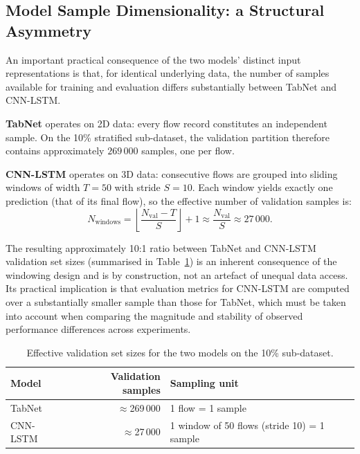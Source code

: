 \documentclass[../main.tex]{subfiles}
\begin{document}
\subsection{Model Sample Dimensionality: a Structural Asymmetry}
\label{sec:sample-dimensionality}

An important practical consequence of the two models' distinct input representations is that, for identical underlying data, the number of samples available for training and evaluation differs substantially between TabNet and CNN-LSTM.

\textbf{TabNet} operates on 2D data: every flow record constitutes an independent sample.  On the 10\% stratified sub-dataset, the validation partition therefore contains approximately $269\,000$ samples, one per flow.

\textbf{CNN-LSTM} operates on 3D data: consecutive flows are grouped into sliding windows of width $T = 50$ with stride $S = 10$.  Each window yields exactly one prediction (that of its final flow), so the effective number of validation samples is:
\[
    N_{\text{windows}} = \left\lfloor \frac{N_{\text{val}} - T}{S} \right\rfloor + 1
    \approx \frac{N_{\text{val}}}{S} \approx 27\,000.
\]

The resulting approximately 10:1 ratio between TabNet and CNN-LSTM validation set sizes (summarised in Table~\ref{tab:sample-sizes}) is an inherent consequence of the windowing design and is by construction, not an artefact of unequal data access.  Its practical implication is that evaluation metrics for CNN-LSTM are computed over a substantially smaller sample than those for TabNet, which must be taken into account when comparing the magnitude and stability of observed performance differences across experiments.

\begin{table}[H]
\centering
\caption{Effective validation set sizes for the two models on the 10\% sub-dataset.}
\label{tab:sample-sizes}
\small
\begin{tabular}{lrl}
\toprule
\textbf{Model}  & \textbf{Validation samples} & \textbf{Sampling unit} \\
\midrule
TabNet          & $\approx$269\,000           & 1 flow = 1 sample \\
CNN-LSTM        & $\approx$27\,000            & 1 window of 50 flows (stride 10) = 1 sample \\
\bottomrule
\end{tabular}
\end{table}
\end{document}
